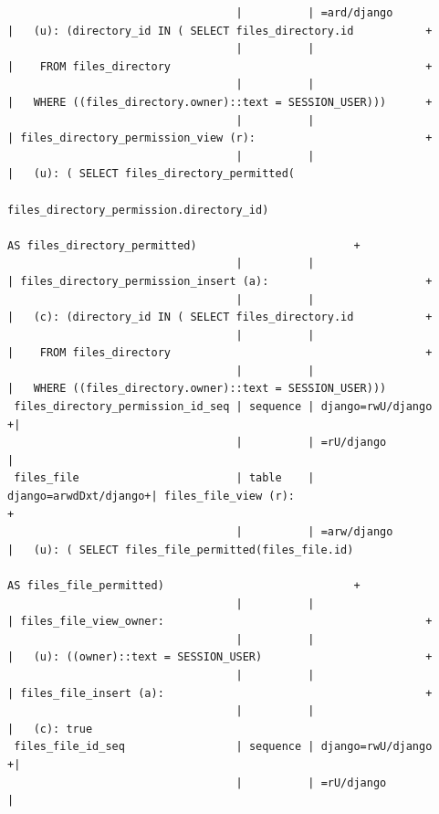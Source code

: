 \documentclass{report}
\begin{document}
\begin{landscape}
{\begin{verbatim}
                                   |          | =ard/django           |   (u): (directory_id IN ( SELECT files_directory.id           +
                                   |          |                       |    FROM files_directory                                       +
                                   |          |                       |   WHERE ((files_directory.owner)::text = SESSION_USER)))      +
                                   |          |                       | files_directory_permission_view (r):                          +
                                   |          |                       |   (u): ( SELECT files_directory_permitted(
                                                                                 files_directory_permission.directory_id)
                                                                                 AS files_directory_permitted)                        +
                                   |          |                       | files_directory_permission_insert (a):                        +
                                   |          |                       |   (c): (directory_id IN ( SELECT files_directory.id           +
                                   |          |                       |    FROM files_directory                                       +
                                   |          |                       |   WHERE ((files_directory.owner)::text = SESSION_USER)))
 files_directory_permission_id_seq | sequence | django=rwU/django    +|
                                   |          | =rU/django            |
 files_file                        | table    | django=arwdDxt/django+| files_file_view (r):                                          +
                                   |          | =arw/django           |   (u): ( SELECT files_file_permitted(files_file.id)
                                                                                 AS files_file_permitted)                             +
                                   |          |                       | files_file_view_owner:                                        +
                                   |          |                       |   (u): ((owner)::text = SESSION_USER)                         +
                                   |          |                       | files_file_insert (a):                                        +
                                   |          |                       |   (c): true
 files_file_id_seq                 | sequence | django=rwU/django    +|
                                   |          | =rU/django            |

\end{verbatim}}
\end{landscape}
\end{document}

